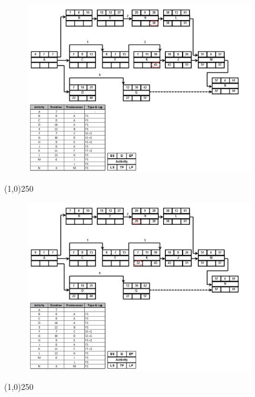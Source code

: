 \begin{frame}
\begin{figure}
	\centering
		\includegraphics[width = 10.0cm]{oldnotes/Slide228.jpg}
\end{figure}
\end{frame}
\begin{center}\line(1,0){250}\end{center}




\begin{frame}
\begin{figure}
	\centering
		\includegraphics[width = 10.0cm]{oldnotes/Slide229.jpg}
\end{figure}
\end{frame}
\begin{center}\line(1,0){250}\end{center}




